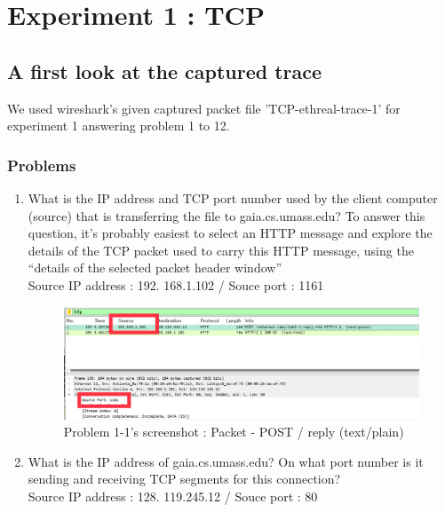 \section{Experiment 1 : TCP}
\subsection{A first look at the captured trace}
    We used wireshark's given captured packet file 'TCP-ethreal-trace-1' for experiment 1 answering problem 1 to 12.
    \subsubsection*{Problems}
    \begin{enumerate}[label=\bfseries Problem \arabic*:,leftmargin=*,labelindent=1em]
        \item What is the IP address and TCP port number used by the client computer (source) that is transferring the file to gaia.cs.umass.edu?
        To answer this question, it’s probably easiest to select an HTTP message and explore the details of the TCP packet used to carry this HTTP message, using the “details of the selected packet header window”\\[0.2mm]
        \soln Source IP address : 192. 168.1.102  /  Souce port : 1161
        \begin{figure}[!h]\centering
        \hspace{15mm}
    		\includegraphics[width=.85\textwidth]{image/week02/1-1-1.png}
    		\caption{\footnotesize Problem 1-1's screenshot : Packet - POST / reply (text/plain)}
    		\vspace{-10pt}
        \end{figure}
        \item What is the IP address of gaia.cs.umass.edu? On what port number is it sending and receiving TCP segments for this connection?\\[0.2mm]
        \soln Source IP address : 128. 119.245.12  /  Souce port : 80

\end{enumerate}
